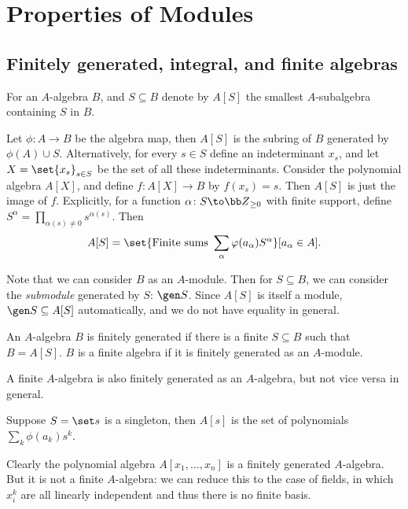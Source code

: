 \section{Properties of Modules}

\subsection{Finitely generated, integral, and finite algebras}

\bdefn

    For an $A$-algebra $B$, and $S\subseteq B$ denote by $A[S]$ the smallest $A$-subalgebra containing $S$ in $B$.

\edefn

Let $\phi\colon A\to B$ be the algebra map, then $A[S]$ is the subring of $B$ generated by $\phi(A)\cup S$.
Alternatively, for every $s\in S$ define an indeterminant $x_s$, and let $X=\set{x_s}_{s\in S}$ be the set of all these indeterminants.
Consider the polynomial algebra $A[X]$, and define $f\colon A[X]\to B$ by $f(x_s)=s$.
Then $A[S]$ is just the image of $f$.
Explicitly, for a function $\alpha\colon S\to\bZ_{\geq0}$ with finite support, define $S^\alpha=\prod_{\alpha(s)\neq0}s^{\alpha(s)}$.
Then
$$ A[S] = \set{\hbox{Finite sums }\sum_\alpha\phi(a_\alpha)S^\alpha}[a_\alpha\in A] . $$

Note that we can consider $B$ as an $A$-module.
Then for $S\subseteq B$, we can consider the {\it submodule\/} generated by $S$: $\gen S$.
Since $A[S]$ is itself a module, $\gen S\subseteq A[S]$ automatically, and we do not have equality in general.

\bdefn

    An $A$-algebra $B$ is {\emphcolor finitely generated} if there is a finite $S\subseteq B$ such that $B=A[S]$.
    $B$ is a {\emphcolor finite algebra} if it is finitely generated as an $A$-module.

\edefn

A finite $A$-algebra is also finitely generated as an $A$-algebra, but not vice versa in general.

\bexam

    Suppose $S=\set s$ is a singleton, then $A[s]$ is the set of polynomials $\sum_k\phi(a_k)s^k$.

\eexam

\bexam

    Clearly the polynomial algebra $A[x_1,\dots,x_n]$ is a finitely generated $A$-algebra.
    But it is not a finite $A$-algebra: we can reduce this to the case of fields, in which $x_i^k$ are all linearly independent and thus
    there is no finite basis.

